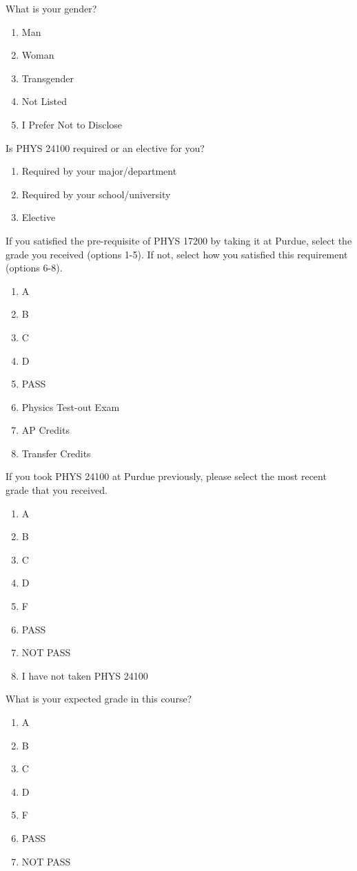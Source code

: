 What is your gender?

\begin{enumerate}
	\item Man
	\item Woman
	\item Transgender
	\item Not Listed
	\item I Prefer Not to Disclose
\end{enumerate}

Is PHYS 24100 required or an elective for you?

\begin{enumerate}
	\item Required by your major/department
	\item Required by your school/university
	\item Elective
\end{enumerate}

If you satisfied the pre-requisite of PHYS 17200 by taking it at Purdue, select the grade you received (options 1-5). If not, select how you satisfied this requirement (options 6-8).

\begin{enumerate}
	\item A
	\item B
	\item C
	\item D
	\item PASS
	\item Physics Test-out Exam
	\item AP Credits
	\item Transfer Credits
\end{enumerate}

If you took PHYS 24100 at Purdue previously, please select the most recent grade that you received.

\begin{enumerate}
	\item A
	\item B
	\item C
	\item D
	\item F
	\item PASS
	\item NOT PASS
	\item I have not taken PHYS 24100
\end{enumerate}

What is your expected grade in this course?

\begin{enumerate}
	\item A
	\item B
	\item C
	\item D
	\item F
	\item PASS
	\item NOT PASS
\end{enumerate}

